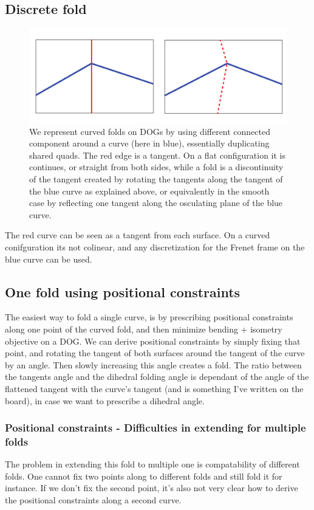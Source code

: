 \documentclass{article}
\theoremstyle{definition}
\begin{document}
\subsection{Discrete fold}

\begin{figure} [h]
	\centering
	\includegraphics[width=0.5\linewidth]{folding_an_edge.pdf}
	\caption{We represent curved folds on DOGs by using different connected component around a curve (here in blue), essentially duplicating shared quads. The red edge is a tangent. On a flat configuration it is continues, or straight from both sides, while a fold is a discontinuity of the tangent created by rotating the tangents along the tangent of the blue curve as explained above, or equivalently in the smooth case by reflecting one tangent along the osculating plane of the blue curve.}
	\label{fig:folding_an_edge.pdf}
\end{figure}
The red curve can be seen as a tangent from each surface. On a curved conifguration its not colinear, and any discretization for the Frenet frame on the blue curve can be used.

\subsection{One fold using positional constraints}
The easiest way to fold a single curve, is by prescribing positional constraints along one point  of the curved fold, and then minimize bending + isometry objective on a DOG. We can derive positional constraints by simply fixing that point, and rotating the tangent of both surfaces around the tangent of the curve by an angle. Then slowly increasing this angle creates a fold. The ratio between the tangents angle and the dihedral folding angle is dependant of the angle of the flattened tangent with the curve's tangent (and is something I've written on the board), in case we want to prescribe a dihedral angle.

\subsubsection{Positional constraints - Difficulties in extending for multiple folds}
The problem in extending this fold to multiple one is compatability of different folds. One cannot fix two points along to different folds and still fold it for instance. If we don't fix the second point, it's also not very clear how to derive the positional constraints along a second curve.
\end{document}
